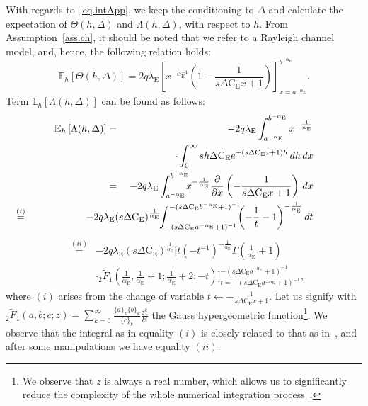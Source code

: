 \documentclass[10pt,journal,a4paper]{IEEEtran}
\begin{document}
With regards to~\eqref{eq.intApp}, we keep the conditioning to $\Delta$ and calculate the expectation of $\Theta(h,\Delta)$ and $\Lambda(h,\Delta)$, with respect to $h$. From Assumption~\ref{ass.ch}, it should be noted that we refer to a Rayleigh channel model, and, hence, the following relation holds:
\begin{equation}
\!\mathbb{E}_h \left[\Theta(h,\Delta)\right] = 2 q \lambda_\mathrm{E}\! \left[x^{-\alpha_\mathrm{E}^{-1}} \!\!\left(1-\frac{1}{s \Delta \mathrm{C_E} x + 1}\right) \right]_{x = a^{-\alpha_\mathrm{E}}}^{b^{-\alpha_\mathrm{E}}}\!\!\!\!\!\!\!\!\!\!\!\!.\!\!
\end{equation}
Term $\mathbb{E}_h \left[\Lambda(h,\Delta)\right]$ can be found as follows:
\setlength{\arraycolsep}{0.0em} 
\begin{eqnarray}
\mathbb{E}_h \left[\Lambda(h,\Delta)\right] &{}={}& -2 q \lambda_\mathrm{E} \int_{a^{-\alpha_\mathrm{E}}}^{b^{-\alpha_\mathrm{E}}} x^{-\frac{1}{\alpha_\mathrm{E}}} \notag\\
&&  \cdot \int_0^\infty s h \Delta \mathrm{C_E}  e^{-(s \Delta \mathrm{C_E} x+1)h} \, dh \, dx \label{eq.Gauss}\\
&{}={}& -2 q \lambda_\mathrm{E} \int_{a^{-\alpha_\mathrm{E}}}^{b^{-\alpha_\mathrm{E}}}  \!\!\!x^{-\frac{1}{\alpha_\mathrm{E}}} \frac{\partial}{\partial x}\left(-\frac{1}{s \Delta \mathrm{C_E} x + 1}\right) \, dx\nonumber\\
&{}\hspace{-33mm}\stackrel{(i)}{=}{}&\hspace{-16mm}-2 q \lambda_\mathrm{E} (s\Delta \mathrm{C_E})^{\frac{1}{\alpha_\mathrm{E}}} \!\!\int_{-(s \Delta \mathrm{C_E} a^{-\alpha_\mathrm{E}}+1)^{-1}}^{-(s \Delta \mathrm{C_E} b^{-\alpha_\mathrm{E}}+1)^{-1}}  \!\!\!\left(-\frac{1}{t}-1\right)^{-\frac{1}{\alpha_\mathrm{E}}}  dt\nonumber
\end{eqnarray}
\begin{eqnarray}
&{}\stackrel{(ii)}{=}{}&-2 q \lambda_\mathrm{E} (s\Delta \mathrm{C_E})^{\frac{1}{\alpha_\mathrm{E}}} \Bigg[t (-t^{-1})^{-\frac{1}{\alpha_\mathrm{E}}}\Gamma\left(\frac{1}{\alpha_\mathrm{E}} + 1\right)\nonumber\\
&& \cdot {}_2\tilde{F}_1\left(\frac{1}{\alpha_\mathrm{E}}, \frac{1}{\alpha_\mathrm{E}}+1;\frac{1}{\alpha_\mathrm{E}}+2;-t\right)\Bigg]_{t = -(s \Delta \mathrm{C_E} a^{-\alpha_\mathrm{E}}+1)^{-1}}^{-(s \Delta \mathrm{C_E} b^{-\alpha_\mathrm{E}}+1)^{-1}}\nonumber,
\end{eqnarray}
where $(i)$ arises from the change of variable $t \leftarrow -\frac{1}{s \Delta \mathrm{C_E} x + 1}$. Let us signify with ${}_2\tilde{F}_1(a, b; c; z) = \sum_{k = 0}^\infty \frac{\{a\}_k\{b\}_k}{\{c\}_k} \frac{z^k}{k!}$ the Gauss hypergeometric function\footnote{We observe that $z$ is always a real number, which allows us to significantly reduce the complexity of the whole numerical integration process~\cite{hankin:2015}.}. We observe that the integral as in equality $(i)$ is closely related to that as in~\cite[Eq.~(3.228.3)]{jeffrey2007table}, and after some manipulations we have equality $(ii)$.
\end{document}
